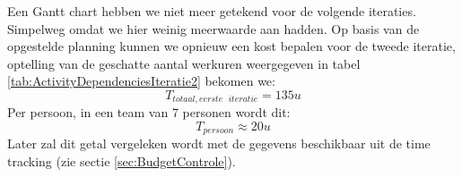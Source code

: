 Een Gantt chart hebben we niet meer getekend voor de volgende iteraties. Simpelweg omdat we hier weinig meerwaarde aan hadden. Op basis van de opgestelde planning kunnen we opnieuw een kost bepalen voor de tweede iteratie, optelling van de geschatte aantal werkuren weergegeven in tabel \ref{tab:ActivityDependenciesIteratie2} bekomen we:
\begin{equation*}
	T_{totaal, eerste\text{ }iteratie} = 135u
\end{equation*} 
Per persoon, in een team van 7 personen wordt dit:
\begin{equation*}
	T_{persoon} \approx 20u
\end{equation*}
Later zal dit getal vergeleken wordt met de gegevens beschikbaar uit de time tracking (zie sectie \ref{sec:BudgetControle}).


